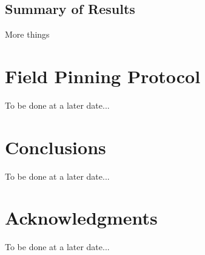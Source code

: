 \documentclass{sig-alternate}
\begin{document}
\subsection{Summary of Results}
\label{sec:collieResults}

More things


\section{Field Pinning Protocol}
\label{sec:fpp}

To be done at a later date...


\section{Conclusions}
\label{sec:conclusions}

To be done at a later date...


\section*{Acknowledgments}
\label{sec:acknowledgments}

To be done at a later date...



  
\end{document}
